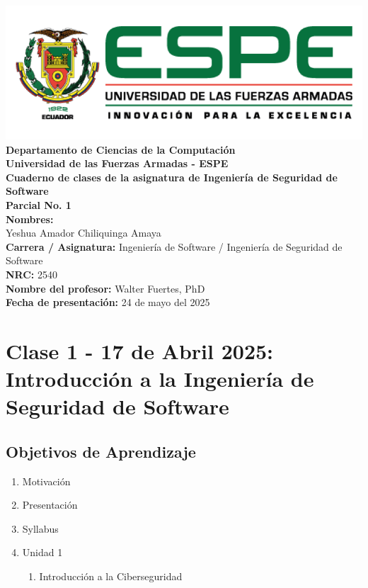 \documentclass[12pt,a4paper]{article}
\begin{document}
\begin{titlepage}
    \centering
    \vspace*{1cm}
    \includegraphics[width=0.8\linewidth]{espe.png}\\[0.5cm]
    
    \Large \textbf{Departamento de Ciencias de la Computación}\\
    \large \textbf{Universidad de las Fuerzas Armadas - ESPE}\\[0.5cm]
    
    \Huge \textbf{Cuaderno de clases de la asignatura de Ingeniería de Seguridad de Software}\\[0.3cm]
    \Large \textbf{Parcial No. 1}\\[0.8cm]
    
    \textbf{Nombres:}\\
    Yeshua Amador Chiliquinga Amaya\\[0.3cm]
    
    \textbf{Carrera / Asignatura:} Ingeniería de Software / Ingeniería de Seguridad de Software\\
    \textbf{NRC:} 2540\\
    \textbf{Nombre del profesor:} Walter Fuertes, PhD\\[0.5cm]
    
    \textbf{Fecha de presentación:} 24 de mayo del 2025\\[1cm]    
    \vfill
\end{titlepage}

\tableofcontents
\newpage

\section{Clase 1 - 17 de Abril 2025: Introducción a la Ingeniería de Seguridad de Software}
\subsection{Objetivos de Aprendizaje}
\begin{enumerate}
    \item Motivación
    \item Presentación
    \item Syllabus
    \item Unidad 1
    \begin{enumerate}
        \item Introducción a la Ciberseguridad
    \end{enumerate}
\end{enumerate}
\end{document}
